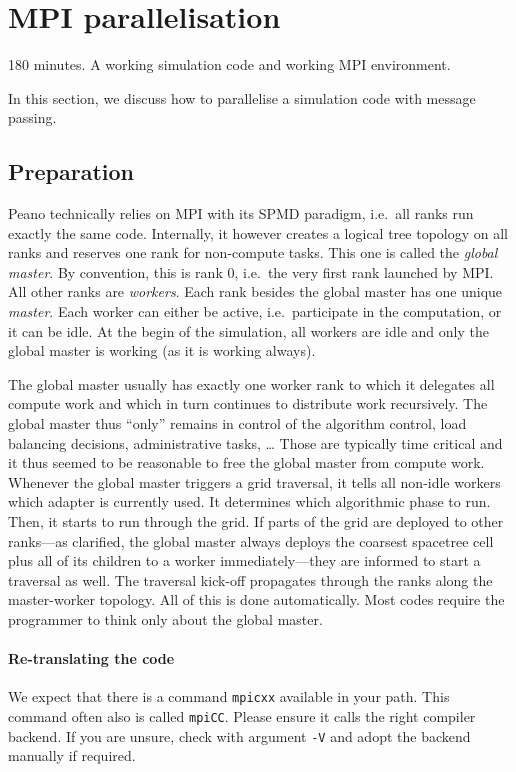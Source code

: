 \section{MPI parallelisation}
  \label{section:parallelisation:mpi}


\chapterDescription
  {
    180 minutes.
  }
  {
    A working simulation code and working MPI environment.
  }

In this section, we discuss how to parallelise a simulation code with message
passing.

\subsection{Preparation}

Peano technically relies on MPI with its SPMD paradigm, i.e.~all ranks run
exactly the same code.
Internally, it however creates a logical tree topology on all ranks and
reserves one rank for non-compute tasks.
This one is called the {\em global master}.
By convention, this is rank 0, i.e.~the very first rank launched by MPI.
All other ranks are {\em workers}.
Each rank besides the global master has one unique {\em master}.
Each worker can either be active, i.e.~participate in the computation, or it can
be idle.
At the begin of the simulation, all workers are idle and only the global master
is working (as it is working always).

The global master usually has exactly one worker rank to which it delegates all
compute work and which in turn continues to distribute work recursively.
The global master thus ``only'' remains in control of the algorithm control,
load balancing decisions, administrative tasks, \ldots
Those are typically time critical and it thus seemed to be reasonable to free
the global master from compute work.
Whenever the global master triggers a grid traversal, it tells all non-idle
workers which adapter is currently used.
It determines which algorithmic phase to run. 
Then, it starts to run through the grid. 
If parts of the grid are deployed to other ranks---as clarified, the global
master always deploys the coarsest spacetree cell plus all of its children to a
worker immediately---they are informed to start a traversal as well.
The traversal kick-off propagates through the ranks along the master-worker
topology.
All of this is done automatically.
Most codes require the programmer to think only about the global master.

\paragraph{Re-translating the code}
We expect that there is a command \texttt{mpicxx} available in your path.
This command often also is called \texttt{mpiCC}. Please ensure it calls the
right compiler backend. 
If you are unsure, check with argument \texttt{-V} and adopt the backend
manually if required. 

